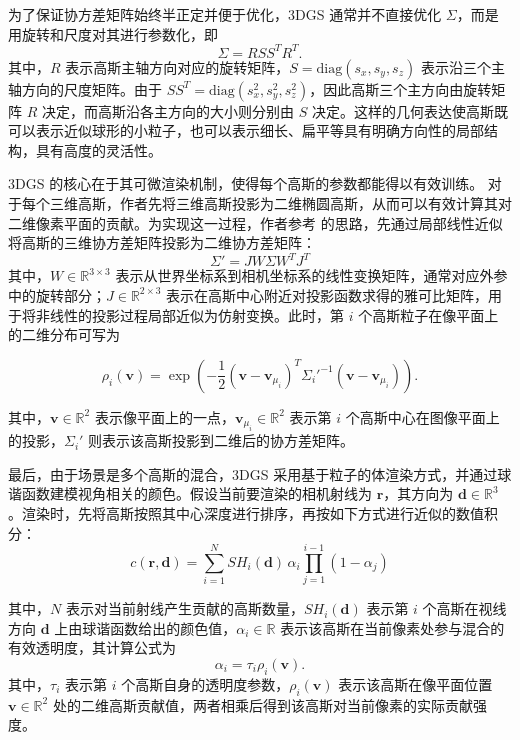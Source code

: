 为了保证协方差矩阵始终半正定并便于优化，3DGS 通常并不直接优化 \(\Sigma\)，而是用旋转和尺度对其进行参数化，即
\begin{equation}
    \label{equ:3dgs-covariance}
    \Sigma = R S S^{T} R^{T}.
\end{equation}
其中，\(R\) 表示高斯主轴方向对应的旋转矩阵，\(S=\mathrm{diag}(s_{x},s_{y},s_{z})\) 表示沿三个主轴方向的尺度矩阵。由于 \(S S^{T}=\mathrm{diag}(s_{x}^{2},s_{y}^{2},s_{z}^{2})\)，因此高斯三个主方向由旋转矩阵 \(R\) 决定，而高斯沿各主方向的大小则分别由 \(S\) 决定。这样的几何表达使高斯既可以表示近似球形的小粒子，也可以表示细长、扁平等具有明确方向性的局部结构，具有高度的灵活性。

3DGS 的核心在于其可微渲染机制，使得每个高斯的参数都能得以有效训练。
对于每个三维高斯，作者先将三维高斯投影为二维椭圆高斯，从而可以有效计算其对二维像素平面的贡献。为实现这一过程，作者参考 \cite{zwicker2002ewa} 的思路，先通过局部线性近似将高斯的三维协方差矩阵投影为二维协方差矩阵：
\begin{equation}
    \label{equ:3dgs-projection}
    \Sigma' = J W \Sigma W^{T} J^{T}
\end{equation}
其中，\(W \in \mathbb{R}^{3 \times 3}\) 表示从世界坐标系到相机坐标系的线性变换矩阵，通常对应外参中的旋转部分；\(J \in \mathbb{R}^{2 \times 3}\) 表示在高斯中心附近对投影函数求得的雅可比矩阵，用于将非线性的投影过程局部近似为仿射变换。此时，第 \(i\) 个高斯粒子在像平面上的二维分布可写为

\begin{equation}
    \label{equ:3dgs-screen-density}
    \rho_i(\mathbf{v})=\exp\left(-\frac{1}{2}(\mathbf{v}-\mathbf{v}_{\mu_i})^{T}{\Sigma_i'}^{-1}(\mathbf{v}-\mathbf{v}_{\mu_i})\right).
\end{equation}

其中，\(\mathbf{v}\in \mathbb{R}^{2}\) 表示像平面上的一点，\(\mathbf{v}_{\mu_i}\in \mathbb{R}^{2}\) 表示第 \(i\) 个高斯中心在图像平面上的投影，\(\Sigma_i'\) 则表示该高斯投影到二维后的协方差矩阵。

最后，由于场景是多个高斯的混合，3DGS 采用基于粒子的体渲染方式，并通过球谐函数建模视角相关的颜色。假设当前要渲染的相机射线为 \(\mathbf{r}\)，其方向为 \(\mathbf{d}\in\mathbb{R}^{3}\)。渲染时，先将高斯按照其中心深度进行排序，再按如下方式进行近似的数值积分：
\begin{equation}
    \label{equ:3dgs-render}
    c(\mathbf{r}, \mathbf{d}) = \sum_{i=1}^{N} SH_i(\mathbf{d}) \, \alpha_i \prod_{j=1}^{i-1} (1-\alpha_j)
\end{equation}

其中，\(N\) 表示对当前射线产生贡献的高斯数量，\(SH_i(\mathbf{d})\) 表示第 \(i\) 个高斯在视线方向 \(\mathbf{d}\) 上由球谐函数给出的颜色值，\(\alpha_i\in\mathbb{R}\) 表示该高斯在当前像素处参与混合的有效透明度，其计算公式为
\begin{equation}
    \label{equ:3dgs-alpha}
    \alpha_i = \tau_i \rho_i(\mathbf{v}).
\end{equation}
其中，\(\tau_i\) 表示第 \(i\) 个高斯自身的透明度参数，\(\rho_i(\mathbf{v})\) 表示该高斯在像平面位置 \(\mathbf{v}\in\mathbb{R}^{2}\) 处的二维高斯贡献值，两者相乘后得到该高斯对当前像素的实际贡献强度。

